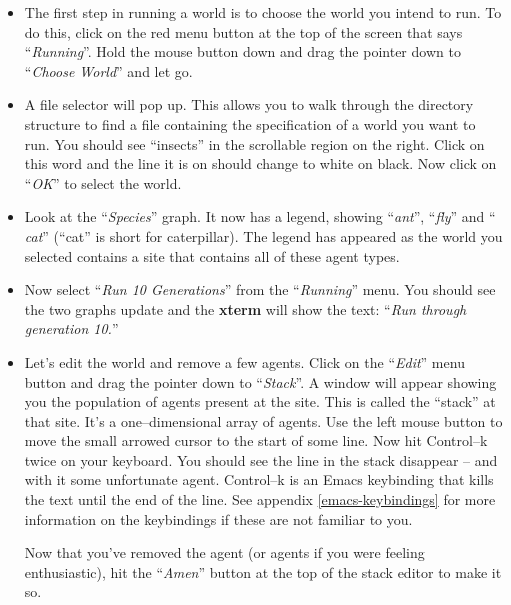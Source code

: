 \begin{itemize}

\item
The first step in running a world is to choose the world you intend to
run. To do this, click on the red menu button at the top of the screen
that says ``{\sl Running}''. Hold the mouse button down and drag the
pointer down to ``{\sl Choose World}'' and let go. 

\item
A file selector will pop up. This allows you to walk through the
directory structure to find a file containing the specification of a
world you want to run. You should see ``insects'' in the scrollable
region on the right. Click on this word and the line it is on should
change to white on black. Now click on ``{\sl OK}'' to select the
world.

\item
Look at the ``{\sl Species}'' graph. It
now has a legend, showing ``{\sl ant}'', ``{\sl fly}'' and ``{\sl
cat}'' (``cat'' is short for caterpillar). The legend has appeared as
the world you selected contains a site that contains all of these
agent types.

\item
Now select ``{\sl Run 10 Generations}'' from the ``{\sl Running}''
menu. You should see the two graphs update and the
{\bf xterm} will show the text: ``{\sl Run through generation 10.}''

\item
Let's edit the world and remove a few agents.
 Click on the ``{\sl Edit}'' menu button and drag
the pointer down to ``{\sl Stack}''. A window will appear showing you
the population of agents present at the site. This is called the
``stack'' at that site. It's a one--dimensional array of agents. Use
the left mouse button to move the small arrowed cursor to the start of
some line. Now hit Control--k twice on your keyboard. You should see
the line in the stack disappear -- and with it some unfortunate
agent. Control--k is an Emacs keybinding that kills the text until the
end of the line. See appendix
\ref{emacs-keybindings} for more information on the keybindings if
these are not familiar to you.

Now that you've removed the agent (or agents if you were feeling
enthusiastic), hit the ``{\sl Amen}'' button at the top of the stack
editor to make it so.


\end{itemize}
